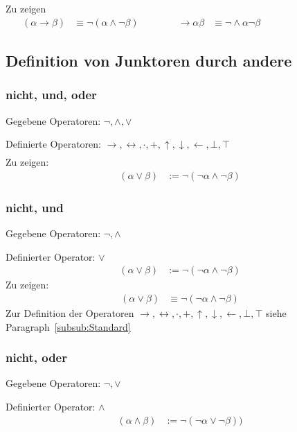 \documentclass[english,ngerman,parskip=half,headsepline,footsepline,
	fleqn,notitlepage]{scrreprt}
\newcommand*{\defeq}{:=}%
\newcommand*{\ladd}{+}
\newcommand*{\lmult}{\cdot}
\newcommand*{\ltrue}{\top}%
\newcommand*{\lfalse}{\bot}%
\newcommand*{\lrep}{\leftarrow}%
\newcommand*{\limp}{\rightarrow}%
\newcommand*{\lequiv}{\leftrightarrow}%
\newcommand*{\lnand}{\uparrow}%
\newcommand*{\lnor}{\downarrow}%
\newcommand*{\formulatoleft}{&&&&&&&&&&}%
\newcommand*{\formulaspace}{&&&&}%
\newcommand*{\subsubsectionname}{Paragraph}
\begin{document}
	Zu zeigen
	\begin{align}
		(\alpha\limp\beta)&\equiv\lnot(\alpha\land\lnot\beta)
		\formulaspace
		&\limp\alpha\beta&\equiv\lnot\land\alpha\lnot\beta
		\formulatoleft
	\end{align}

	\subsection{Definition von Junktoren durch andere}%
	\label{sub:Junktordefinitionen}

	\subsubsection{nicht, und, oder}%
	\label{subsub:Standard}
	\label{subsub:OperatorenAnfang}
	Gegebene Operatoren: $\lnot, \land, \lor$\par
	Definierte Operatoren:
	$\limp, \lequiv, \lmult, \ladd, \lnand, \lnor, \lrep, \lfalse, \ltrue$
	\begin{align}
	\end{align}
	Zu zeigen:
	\begin{align}
		(\alpha\lor\beta)&\defeq\lnot(\lnot\alpha\land\lnot\beta)
	\end{align}

	\subsubsection{nicht, und}%
	Gegebene Operatoren: $\lnot, \land$\par
	Definierter Operator: $\lor$
	\begin{align}
		(\alpha\lor\beta)&\defeq\lnot(\lnot\alpha\land\lnot\beta)
	\end{align}
	Zu zeigen:
	\begin{align}
		(\alpha\lor\beta)&\equiv\lnot(\lnot\alpha\land\lnot\beta)
	\end{align}
	Zur Definition der Operatoren $\limp, \lequiv, \lmult, \ladd, \lnand, \lnor,
	\lrep, \lfalse, \ltrue$ siehe \subsubsectionname~\vref{subsub:Standard}

	\subsubsection{nicht, oder}%
	Gegebene Operatoren: $\lnot, \lor$\par
	Definierter Operator: $\land$
	\begin{align}
		(\alpha\land\beta)&\defeq\lnot(\lnot\alpha\lor\lnot\beta))
	\end{align}
\end{document}
